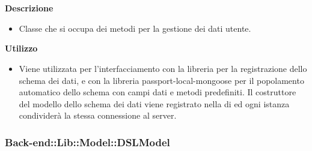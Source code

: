 				\textbf{\\ \\ Descrizione} 
					\begin{itemize}
						\item[] Classe che si occupa dei metodi per la gestione dei dati utente. 
					\end{itemize}      
				\textbf{Utilizzo}  
					\begin{itemize}
						\item[] Viene utilizzata per l'interfacciamento con la libreria  per la registrazione dello schema dei dati, e con la libreria passport-local-mongoose per il popolamento automatico dello schema con campi dati e metodi predefiniti.
Il costruttore del modello dello schema dei dati viene registrato nella  di  ed ogni istanza condividerà la stessa connessione al server.
					\end{itemize}
	\subsubsection{Back-end::Lib::Model::DSLModel}

